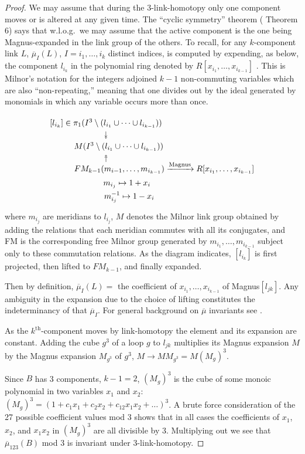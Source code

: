 \documentclass[12pt]{amsart}
\newcommand{\ra}{\rightarrow}
\newcommand{\lbar}[1]{\overline{#1}}
\theoremstyle{definition}
\theoremstyle{remark}
\begin{document}
\begin{proof}
	We may assume that during the 3-link-homotopy only one component moves or is altered at any given time. The ``cyclic symmetry'' theorem (\cite{milnor57} Theorem 6) says that w.l.o.g.\ we may assume that the active component is the one being Magnus-expanded in the link group of the others. To recall, for any $k$-component link $L$, $\lbar{\mu}_I(L)$, $I = i_1,\dots,i_k$ distinct indices, is computed by expending, as below, the component $l_{i_k}$ in the polynomial ring denoted by $R[x_{i_1},\dots,x_{i_{k-1}}]$ \cite{milnor54}. This is Milnor's notation for the integers adjoined $k-1$ non-commuting variables which are also ``non-repeating,'' meaning that one divides out by the ideal generated by monomials in which any variable occurs more than once.

	\begin{equation}\label{eq:magnus-expand}
		\begin{tikzpicture}[baseline={(current bounding box.center)}]
			\node at (0,0.1) {$[l_{i_k}] \in \pi_1(I^3 \setminus (l_{i_1} \cup \cdots \cup l_{i_{k-1}}))$};
			\node[rotate around = {-90:(0,0)}] at (0,-0.4) {$\twoheadrightarrow$};
			\node at (0.55,-0.9) {$M(I^3 \setminus (l_{i_1} \cup \cdots \cup l_{i_{k-1}}))$};
			\node[rotate around = {90:(0,0)}] at (0,-1.4) {$\twoheadrightarrow$};
			\node at (2.5,-1.8) {$FM_{k-1}(m_{i-1},\dots,m_{i_{k-1}}) \xrightarrow{\text{Magnus}} R[x_{i_1},\dots,x_{i_{k-1}}]$};
			\node at (0.9,-2.5) {$m_{i_j} \mapsto 1 + x_i$};
			\node at (1,-3.05) {$m_{i_j}^{-1} \mapsto 1 - x_i$};
		\end{tikzpicture}
	\end{equation}
	where $m_{i_j}$ are meridians to $l_{i_j}$, $M$ denotes the Milnor link group obtained by adding the relations that each meridian commutes with all its conjugates, and FM is the corresponding free Milnor group generated by $m_{i_1},\dots,m_{i_{k-1}}$ subject only to these commutation relations. As the diagram indicates, $[l_{i_k}]$ is first projected, then lifted to $FM_{k-1}$, and finally expanded.

	Then by definition, $\lbar{\mu}_I(L) =$ the coefficient of $x_{i_1},\dots,x_{i_{k-1}}$ of Magnus$[l_{jk}]$. Any ambiguity in the expansion due to the choice of lifting constitutes the indeterminancy of that $\lbar{\mu}_I$. For general background on $\lbar{\mu}$ invariants see \cites{milnor54,milnor57,krushkal98}.

	As the $k^{\text{th}}$-component moves by link-homotopy the element and its expansion are constant. Adding the cube $g^3$ of a loop $g$ to $l_{jk}$ multiplies its Magnus expansion $M$ by the Magnus expansion $M_{g^3}$ of $g^3$, $M \ra MM_{g^3} = M(M_g)^3$.

	Since $B$ has 3 components, $k - 1 = 2$, $(M_g)^3$ is the cube of some monoic polynomial in two variables $x_1$ and $x_2$: $(M_g)^3 = (1 + c_1 x_1 + c_2 x_2 + c_{12}x_1x_2 + \dots)^3$. A brute force consideration of the 27 possible coefficient values mod 3 shows that in all cases the coefficients of $x_1$, $x_2$, and $x_1x_2$ in $(M_g)^3$ are all divisible by 3. Multiplying out we see that $\lbar{\mu}_{123}(B)$ mod 3 is invariant under 3-link-homotopy.
\end{proof}
\end{document}
